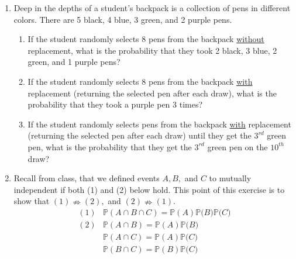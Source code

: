 \documentclass[12pt]{article}
\begin{document}
\begin{enumerate}





\item \label{Ch_3_pens} Deep in the depths of a student's backpack is a collection of pens in different colors. There are 5 black, 4 blue, 3 green, and  2 purple pens. 

\begin{enumerate}
\item If the student randomly selects 8 pens from the backpack \underline{without} replacement, what is the probability that they took 2 black, 3 blue, 2 green, and 1 purple pens?

\item If the student randomly selects 8 pens from the backpack \underline{with} replacement (returning the selected pen after each draw), what is the probability that they took a purple pen 3 times?

\item If the student randomly selects pens from the backpack \underline{with} replacement (returning the selected pen after each draw) until they get the $3^{rd}$ green pen, what is the probability that they get the $3^{rd}$ green pen on the $10^{th}$ draw?

\end{enumerate}


\item \label{Ch3_mutindep} Recall from class, that we defined events $A,B,$ and $C$ to mutually
independent if both (1) and (2) below hold. This point of this exercise is to
show that $(1)\nRightarrow (2),$ and $(2)\nRightarrow (1).$%
\begin{equation*}
\begin{array}{cc}
(1) & \mathbb{P}(A\cap B\cap C)=\mathbb{P}(A)\mathbb{P(}B)\mathbb{P(}C) \\ 
(2) & \mathbb{P}(A\cap B)=\mathbb{P}(A)\mathbb{P(}B) \\ 
& \mathbb{P}(A\cap C)=\mathbb{P}(A)\mathbb{P(}C) \\ 
& \mathbb{P}(B\cap C)=\mathbb{P}(B)\mathbb{P(}C)%
\end{array}%
\end{equation*}


\end{enumerate}
\end{document}
